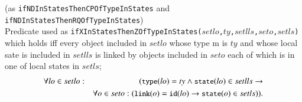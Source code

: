 \documentclass[12pt]{report}
\newcommand{\ra}{\rightarrow}
\newcommand{\mbstt}[1]{\mbox{\small{\tt {#1}}}}
\newcommand{\stt}[1]{{\small{\tt {#1}}}}
\begin{document}
\begin{itemize}
(as \stt{ifNDInStatesThenCPOfTypeInStates} and \stt{ifNDInStatesThenRQOfTypeInStates})\\
  Predicate used as
  \stt{ifXInStatesThenZOfTypeInStates($setlo$,$ty$,$setlls$,$seto$,$setls$)}
  which holds iff every object included in $setlo$ whose type
m  is $ty$ and whose local sate is included in $setlls$ is linked by
  objects included in $seto$ each of which is in one of local states
  in $setls$;
  \vspace{-0.3cm}
  \begin{eqnarray*}
    \forall lo\in setlo:&&(\mbstt{type}(lo)=ty\land\mbstt{state}(lo)\in setlls\ra\\
    &&\forall o\in seto: (\mbstt{link}(o)=\mbstt{id}(lo)\ra\mbstt{state}(o)\in setls)).
  \end{eqnarray*}
\end{itemize}
\end{document}
